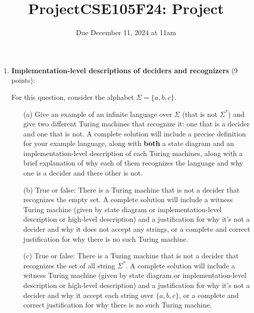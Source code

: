 \begin{enumerate}[wide, labelwidth=!, labelindent=0pt]
\begin{enumerate}
\end{enumerate}



\item\textbf{Implementation-level descriptions of deciders and recognizers} (9 points):

For this question, consider the alphabet $\Sigma = \{a,b,c\}$.
\begin{enumerate}
\item[(a)]\gradeCorrect Give an example of an infinite language over $\Sigma$ (that is not $\Sigma^*$) and give
two different Turing machines that recognize it: one that is a decider and one that is not.
A complete solution will include a precise definition for your example language, 
along with {\bf both} a state diagram and an implementation-level description 
of each Turing machines, along with a brief explanation of why each of them recognizes
the language and why one is a decider and there other is not.

\item[(b)]\gradeComplete True or false: There is a Turing machine that is not a decider that recognizes 
the empty set. A complete solution will include a witness Turing machine (given by 
state diagram or implementation-level description or high-level description) and a justification 
for why it's not a decider and why it does not accept any strings, or a complete and correct
justification for why there is no such Turing machine.

\item[(c)]\gradeComplete True or false: There is a Turing machine that is not a decider that recognizes 
the set of all string $\Sigma^*$.  A complete solution will include a witness Turing machine 
(given by 
state diagram or implementation-level description or high-level description) and a justification 
for why it's not a decider and why it accept each string over $\{a,b,c\}$, or a complete and correct
justification for why there is no such Turing machine.
\end{enumerate}
\end{enumerate}
\newpage
\titleformat{\subsubsection}[runin]
   {\normalfont\bfseries}{}{}{}
   
\title{ProjectCSE105F24: Project}
\date{Due December 11, 2024 at 11am}


\maketitle

